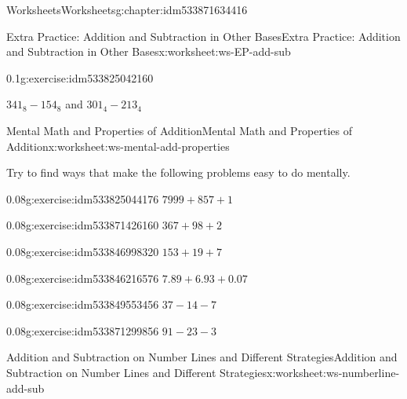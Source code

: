 \documentclass[twoside,11pt,]{book}
\begin{document}
\begin{chapterptx}{Worksheets}{}{Worksheets}{}{}{g:chapter:idm533871634416}
\begin{worksheet-section-numberless}{Extra Practice: Addition and Subtraction in Other Bases}{}{Extra Practice: Addition and Subtraction in Other Bases}{}{}{x:worksheet:ws-EP-add-sub}
\begin{divisionexercise}{2}{}{0.1}{g:exercise:idm533825042160}
\par
\(341_8 - 154_8 \) and \(301_4 -213_4\)%
\end{divisionexercise}%
\end{worksheet-section-numberless}
\restoregeometry
%
%
\typeout{************************************************}
\typeout{************************************************}
%
\begin{worksheet-section-numberless}{Mental Math and Properties of Addition}{}{Mental Math and Properties of Addition}{}{}{x:worksheet:ws-mental-add-properties}
\begin{introduction}{}%
Try to find ways that make the following problems easy to do mentally.%
\end{introduction}%
\begin{divisionexercise}{1}{}{0.08}{g:exercise:idm533825044176}%
\(7999+857+1\)%
\end{divisionexercise}%
\begin{divisionexercise}{2}{}{0.08}{g:exercise:idm533871426160}%
\(367+98+2\)%
\end{divisionexercise}%
\begin{divisionexercise}{3}{}{0.08}{g:exercise:idm533846998320}%
\(153+19+7\)%
\end{divisionexercise}%
\begin{divisionexercise}{4}{}{0.08}{g:exercise:idm533846216576}%
\(7.89+6.93+0.07\)%
\end{divisionexercise}%
\begin{divisionexercise}{5}{}{0.08}{g:exercise:idm533849553456}%
\(37-14-7\)%
\end{divisionexercise}%
\begin{divisionexercise}{6}{}{0.08}{g:exercise:idm533871299856}%
\(91-23-3\)%
\end{divisionexercise}%
\end{worksheet-section-numberless}
\restoregeometry
%
%
\typeout{************************************************}
\typeout{************************************************}
%
\begin{worksheet-section-numberless}{Addition and Subtraction on Number Lines and Different Strategies}{}{Addition and Subtraction on Number Lines and Different Strategies}{}{}{x:worksheet:ws-numberline-add-sub}

\end{worksheet-section-numberless}
\end{chapterptx}
\end{document}
